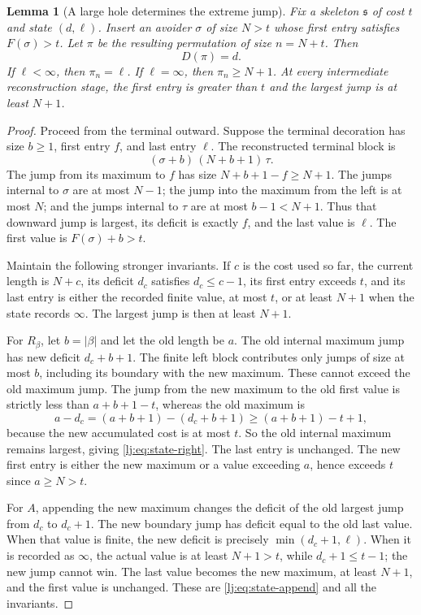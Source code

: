 \documentclass[11pt,a4paper]{article}
\newtheorem{lemma}[lemma]{Lemma}
\theoremstyle{definition}\newaliascnt{definition}{theorem}
\theoremstyle{remark}\newaliascnt{remark}{theorem}
\newcommand{\ljskel}{\mathfrak s}
\begin{document}
\begin{lemma}[A large hole determines the extreme jump]
\label{lj:lem:reconstruction}
Fix a skeleton $\ljskel$ of cost $t$ and state $(d,\ell)$. Insert an avoider
$\sigma$ of size $N>t$ whose first entry satisfies $F(\sigma)>t$.
Let $\pi$ be the resulting permutation of size $n=N+t$. Then
\begin{equation}
 D(\pi)=d.
 \label{lj:eq:deterministic-deficit}
\end{equation}
If $\ell<\infty$, then $\pi_n=\ell$. If $\ell=\infty$, then
$\pi_n\ge N+1$. At every intermediate reconstruction stage, the first
entry is greater than $t$ and the largest jump is at least $N+1$.
\end{lemma}
\begin{proof}
Proceed from the terminal outward. Suppose the terminal decoration has
size $b\ge1$, first entry $f$, and last entry $\ell$. The reconstructed
terminal block is
\[
 (\sigma+b)\,(N+b+1)\,\tau.
\]
The jump from its maximum to $f$ has size $N+b+1-f\ge N+1$.
The jumps internal to $\sigma$ are at most $N-1$; the jump into the
maximum from the left is at most $N$; and the jumps internal to $\tau$
are at most $b-1<N+1$. Thus that downward jump is largest, its deficit
is exactly $f$, and the last value is $\ell$. The first value is
$F(\sigma)+b>t$.

Maintain the following stronger invariants. If $c$ is the cost used so
far, the current length is $N+c$, its deficit $d_c$ satisfies
$d_c\le c-1$, its first entry exceeds $t$, and its last entry is either
the recorded finite value, at most $t$, or at least $N+1$ when the state
records $\infty$. The largest jump is then at least $N+1$.

For $R_\beta$, let $b=|\beta|$ and let the old length be $a$.
The old internal maximum jump has new deficit $d_c+b+1$.
The finite left block contributes only jumps of size at most $b$,
including its boundary with the new maximum. These cannot exceed the
old maximum jump. The jump from the new maximum to the old first value
is strictly less than $a+b+1-t$, whereas the old maximum is
\[
 a-d_c=(a+b+1)-(d_c+b+1)\ge(a+b+1)-t+1,
\]
because the new accumulated cost is at most $t$.
So the old internal maximum remains largest, giving
\eqref{lj:eq:state-right}. The last entry is unchanged. The new first
entry is either the new maximum or a value exceeding $a$, hence exceeds
$t$ since $a\ge N>t$.

For $A$, appending the new maximum changes the deficit of the old
largest jump from $d_c$ to $d_c+1$. The new boundary jump has deficit
equal to the old last value. When that value is finite, the new deficit
is precisely $\min(d_c+1,\ell)$. When it is recorded as $\infty$,
the actual value is at least $N+1>t$, while $d_c+1\le t-1$; the new
jump cannot win. The last value becomes the new maximum, at least
$N+1$, and the first value is unchanged. These are
\eqref{lj:eq:state-append} and all the invariants.
\end{proof}
\end{document}
